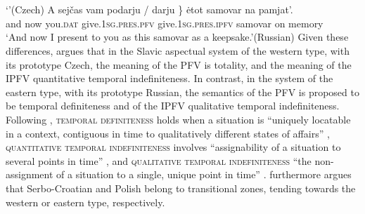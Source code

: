 \documentclass[output=paper,colorlinks,citecolor=brown]{langscibook}
\begin{document}
\ea 
\ea \\
\gll\\
\glt `'\hfill (Czech)\label{ex:perfcz}
\ex A sejčas vam \minsp{\{*} podarju / darju \} {\.e}tot samovar na pamjat'.\\
\gll and now you.\textsc{dat} {} give.\textsc{1sg.pres.pfv} {} give.\textsc{1sg.pres.ipfv} samovar on memory\\
\glt `And now I present to you as this samovar as a keepsake.'\hfill (Russian)\label{ex:perfru}
\z 
\z
\fi 
%
%
%
Given these differences, \citet{Dickey2000} argues that in the Slavic aspectual system of the western type, with its prototype Czech, the meaning of the PFV is totality, and the meaning of the IPFV quantitative temporal indefiniteness. In contrast, in the system of the eastern type, with its prototype Russian, the semantics of the PFV is proposed to be temporal definiteness and of the IPFV qualitative temporal indefiniteness. Following \citet{leinonen82}, \textsc{temporal definiteness} holds when a situation is ``uniquely locatable in a context, contiguous in time to qualitatively different states of affairs'' \citep[][19f.]{Dickey2000}, \textsc{quantitative temporal indefiniteness} involves ``assignability of a situation to several points in time'' \citep[][107]{Dickey2000}, and \textsc{qualitative temporal indefiniteness} ``the non-assignment of a situation to a single, unique point in time'' \citep[][108]{Dickey2000}. \citeauthor{Dickey2000} furthermore argues that Serbo-Croatian and Polish belong to transitional zones, tending towards the western or eastern type, respectively. 
\end{document}
